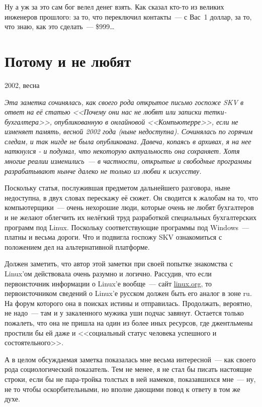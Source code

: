 Ну а уж за это сам бог велел денег взять. Как сказал кто-то из великих инженеров прошлого: за то, что переключил контакты~--- с Вас~1 доллар, за то, что знаю, как это сделать~--- \$999\dots

\section{Потому и не любят} 
\begin{timeline}2002, весна\end{timeline}

\textsl{Эта заметка сочинялась, как своего рода открытое письмо госпоже SKV в ответ на её статью <<Почему они нас не любят или записки тетки-бухгалтера>>, опубликованную в онлайновой <<Компьютерре>>, если не изменяет память, весной 2002 года (ныне недоступна). Сочинялась по горячим следам, и так нигде не была опубликована. Давеча, копаясь в архивах, я на нее наткнулся - и подумал, что некоторую актуальность она сохраняет. Хотя многие реалии изменились~--- в частности, открытые и свободные программы разрабатывают нынче далеко не только из любви к искусству.}\medskip

Поскольку статья, послужившая предметом дальнейшего разговора, ныне недоступна, в двух словах перескажу её сюжет. Он сводится к жалобам на то, что компьютерщики~--- очень нехорошие люди, которые очень не любят бухгалтеров и не желают облегчить их нелёгкий труд разработкой специальных бухгалтерских программ под Linux. Поскольку соответствующие программы под Windows~--- платны и весьма дороги. Что и подвигла госпожу SKV ознакомиться с положением дел на альтернативной платформе.

Должен заметить, что автор этой заметки при своей попытке знакомства с Linux'ом действовала очень разумно и логично. Рассудив, что если первоисточник информации о Linux'е вообще~---  сайт \url{linux.org}, то первоисточником сведений о Linux'е русском должен быть его аналог в зоне ru. На форум которого она в поисках истины и отправилась. Продолжать, вероятно, не надо~--- там и у закаленного мужика уши подчас завянут. Остается только пожалеть, что она не пришла на один из более иных ресурсов, где джентльмены простили бы ей даже и <<социальный статус человека успешного и состоятельного>>.

А в целом обсуждаемая заметка показалась мне весьма интересной~--- как своего рода социологический показатель. Тем не менее, я не стал бы писать настоящие строки, если бы не пара-тройка толстых в ней намеков, показавшихся мне~--- ну, не то чтобы оскорбительными, но вполне дающими повод к ответу в том же духе.

